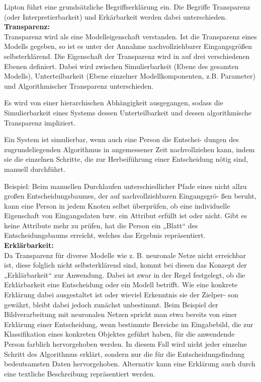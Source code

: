 \documentclass[11pt,a4paper]{article}
\numberwithin{equation}{section}
\begin{document}
	Lipton \cite{lipton2018mythos} führt eine grundsätzliche Begriffserklärung ein. Die Begriffe Transparenz (oder Interpretierbarkeit) und Erkärbarkeit werden dabei unterschieden.\\
	
	
	\noindent \textbf{Transparenz: }\\
	Transparenz wird als eine Modelleigenschaft verstanden. Ist die Transparenz eines Modells
	gegeben, so ist es unter der Annahme nachvollziehbarer Eingangsgrößen selbsterklärend. Die Eigenschaft der	Transparenz wird in \cite{lipton} auf drei verschiedenen Ebenen definiert. Dabei wird zwischen Simulierbarkeit (Ebene des gesamten Modells), Unterteilbarkeit (Ebene einzelner Modellkomponenten, z.B. Parameter) und Algorithmischer Transparenz unterschieden.
	
	Es wird von einer hierarchischen Abhängigkeit ausgegangen, sodass die Simulierbarkeit eines Systems dessen Unterteilbarkeit und dessen algorithmische Transparenz	impliziert. 
	
	Ein System ist simulierbar, wenn
	auch eine Person die Entschei-
	dungen des zugrundeliegenden
	Algorithmus in angemessener
	Zeit nachvollziehen kann, indem sie die einzelnen
	Schritte, die zur Herbeiführung einer Entscheidung nötig sind, manuell durchführt.	
	
	Beispiel: Beim manuellen
	Durchlaufen unterschiedlicher
	Pfade eines nicht allzu großen
	Entscheidungsbaumes, der auf
	nachvollziehbaren Eingangsgrö-
	ßen beruht, kann eine Person in
	jedem Knoten selbst überprüfen,
	ob eine individuelle Eigenschaft
	von Eingangsdaten bzw. ein Attribut erfüllt ist oder nicht.
	Gibt es keine Attribute mehr zu prüfen, hat die Person
	ein „Blatt“ des Entscheidungsbaums erreicht, welches
	das Ergebnis repräsentiert. \\
	
	\noindent \textbf{Erklärbarkeit: }\\
	Da Transparenz für diverse Modelle wie z. B. neuronale
	Netze nicht erreichbar ist, diese folglich nicht selbsterklärend sind, kommt bei diesen das Konzept der „Erklärbarkeit“ zur Anwendung. Dabei ist zwar in der Regel
	festgelegt, ob die Erklärbarkeit eine Entscheidung oder
	ein Modell betrifft. Wie eine konkrete Erklärung dabei
	ausgestaltet ist oder wieviel Erkenntnis sie der Zielper-
	son gewährt, bleibt dabei jedoch zunächst unbestimmt.
	Beim Beispiel der Bildverarbeitung mit neuronalen Netzen spricht man etwa bereits von einer Erklärung einer
	Entscheidung, wenn bestimmte Bereiche im Eingabebild, die zur Klassifikation eines konkreten Objektes geführt haben, für die anwendende Person farblich hervorgehoben werden. In diesem Fall wird nicht jeder einzelne
	Schritt des Algorithmus erklärt, sondern nur die für die
	Entscheidungsfindung bedeutsamsten Daten hervorgehoben. Alternativ kann eine Erklärung auch durch eine
	textliche Beschreibung repräsentiert werden.
	
\end{document}
